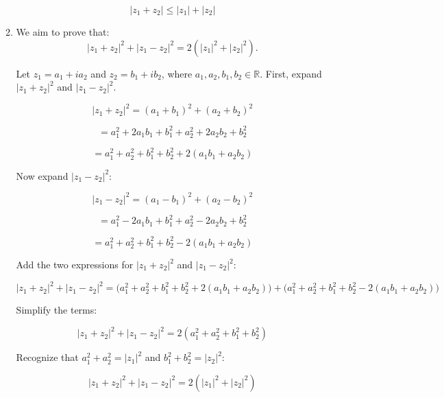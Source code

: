 \documentclass[12pt]{article}
\begin{document}
\begin{enumerate}
\begin{enumerate}
\[
|z_1 + z_2| \leq |z_1| + |z_2|
\]

\item 
We aim to prove that:
\[
|z_1 + z_2|^2 + |z_1 - z_2|^2 = 2(|z_1|^2 + |z_2|^2).
\]

Let \( z_1 = a_1 + i a_2 \) and \( z_2 = b_1 + i b_2 \), where \( a_1, a_2, b_1, b_2 \in \mathbb{R} \). First, expand \( |z_1 + z_2|^2 \) and \( |z_1 - z_2|^2 \).

\[
|z_1 + z_2|^2 = (a_1 + b_1)^2 + (a_2 + b_2)^2
\]

\[
= a_1^2 + 2a_1b_1 + b_1^2 + a_2^2 + 2a_2b_2 + b_2^2
\]

\[
= a_1^2 + a_2^2 + b_1^2 + b_2^2 + 2(a_1b_1 + a_2b_2)
\]

Now expand \( |z_1 - z_2|^2 \):

\[
|z_1 - z_2|^2 = (a_1 - b_1)^2 + (a_2 - b_2)^2
\]

\[
= a_1^2 - 2a_1b_1 + b_1^2 + a_2^2 - 2a_2b_2 + b_2^2
\]

\[
= a_1^2 + a_2^2 + b_1^2 + b_2^2 - 2(a_1b_1 + a_2b_2)
\]

Add the two expressions for \( |z_1 + z_2|^2 \) and \( |z_1 - z_2|^2 \):

\[
|z_1 + z_2|^2 + |z_1 - z_2|^2 = \big(a_1^2 + a_2^2 + b_1^2 + b_2^2 + 2(a_1b_1 + a_2b_2)\big) + \big(a_1^2 + a_2^2 + b_1^2 + b_2^2 - 2(a_1b_1 + a_2b_2)\big)
\]

Simplify the terms:

\[
|z_1 + z_2|^2 + |z_1 - z_2|^2 = 2(a_1^2 + a_2^2 + b_1^2 + b_2^2)
\]

Recognize that \( a_1^2 + a_2^2 = |z_1|^2 \) and \( b_1^2 + b_2^2 = |z_2|^2 \):

\[
|z_1 + z_2|^2 + |z_1 - z_2|^2 = 2(|z_1|^2 + |z_2|^2)
\]
    
\end{enumerate}

\end{enumerate}
\end{document}
